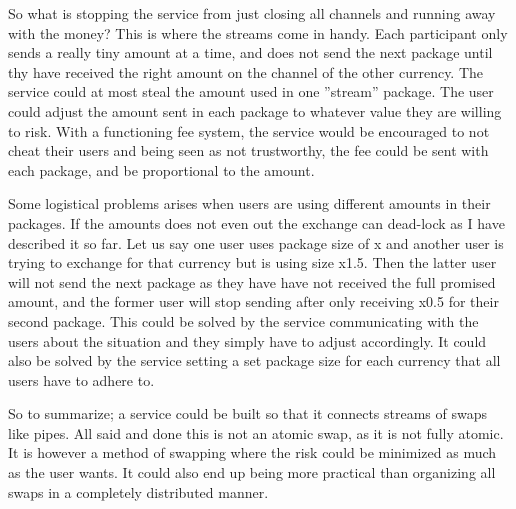 So what is stopping the service from just closing all channels and running away with the money?
This is where the streams come in handy. Each participant only sends a really tiny amount at
a time, and does not send the next package until thy have received the right amount on the 
channel of the other currency. The service could at most steal the amount used in one 
''stream'' package. The user could adjust the amount sent in each package to 
whatever value they are willing to risk. With a functioning fee system, the service would
be encouraged to not cheat their users and being seen as not trustworthy, the fee could be sent 
with each package, and be proportional to the amount.

Some logistical problems arises when users are using different amounts in their packages. 
If the amounts does not even out the exchange can dead-lock as I have described it so far. 
Let us say one user uses package size of x and another user is trying to exchange for that
currency but is using size x1.5. Then the latter user will not send the next package as 
they have have not received the full promised amount, and the former user will stop sending 
after only receiving x0.5 for their second package. This could be solved by the service 
communicating with the users about the situation and they simply have to adjust accordingly. 
It could also be solved by the service setting a set package size for each currency that
all users have to adhere to. 

So to summarize; a service could be built so that it connects streams of swaps like pipes. 
All said and done this is not an atomic swap, as it is not fully atomic. It is however a 
method of swapping where the risk could be minimized as much as the user wants. It could
also end up being more practical than organizing all swaps in a completely 
distributed manner.